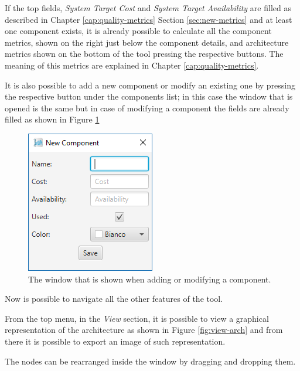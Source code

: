 If the top fields, \emph{System Target Cost} and \emph{System Target Availability} are filled as described in Chapter \ref{cap:quality-metrics} Section \ref{sec:new-metrics} and at least one component exists, it is already possible to calculate all the component metrics, shown on the right just below the component details, and architecture metrics shown on the bottom of the tool pressing the respective buttons. The meaning of this metrics are explained in Chapter \ref{cap:quality-metrics}.

It is also possible to add a new component or modify an existing one by pressing the respective button under the components list; in this case the window that is opened is the same but in case of modifying a component the fields are already filled as shown in Figure \ref{fig:add-modif-comp}

\begin{figure}[!h]
	\centerline
	{\includegraphics[scale=0.6]{img/add_modif_comp.png}}
	\caption[Add/Modify Component]{The window that is shown when adding or modifying a component.}
	\label{fig:add-modif-comp}
\end{figure}

Now is possible to navigate all the other features of the tool.
 
From the top menu, in the \emph{View} section, it is possible to view a graphical representation of the architecture as shown in Figure \ref{fig:view-arch} and from there it is possible to export an image of such representation. 

The nodes can be rearranged inside the window by dragging and dropping them.

